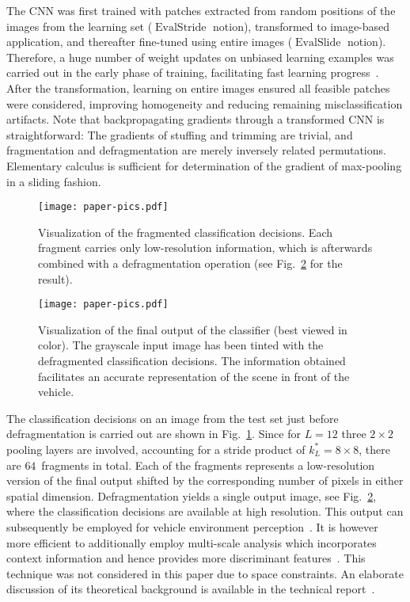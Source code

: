 \documentclass[journal]{IEEEtran}
\DeclareMathOperator{\EvalStride}{EvalStride}
\DeclareMathOperator{\EvalSlide}{EvalSlide}
\begin{document}
The CNN was first trained with patches extracted from random positions of the images from the learning set ($\EvalStride$ notion), transformed to image-based application, and thereafter fine-tuned using entire images ($\EvalSlide$ notion).
Therefore, a huge number of weight updates on unbiased learning examples was carried out in the early phase of training, facilitating fast learning progress~\cite{Bottou2004}.
After the transformation, learning on entire images ensured all feasible patches were considered, improving homogeneity and reducing remaining misclassification artifacts.
Note that backpropagating gradients through a transformed CNN is straightforward:
The gradients of stuffing and trimming are trivial, and fragmentation and defragmentation are merely inversely related permutations.
Elementary calculus is sufficient for determination of the gradient of max-pooling in a sliding fashion.

\begin{figure}[t]
  \centering
  \texttt{[image: paper-pics.pdf]}
  \caption{Visualization of the fragmented classification decisions. Each fragment carries only low-resolution information, which is afterwards combined with a defragmentation operation (see Fig.~\ref{fig:tinted} for the result).}
  \label{fig:fragmented-tinted}
\end{figure}
\begin{figure}[t]
  \centering
  \texttt{[image: paper-pics.pdf]}
  \caption{Visualization of the final output of the classifier (best viewed in color). The grayscale input image has been tinted with the defragmented classification decisions. The information obtained facilitates an accurate representation of the scene in front of the vehicle.}
  \label{fig:tinted}
\end{figure}

The classification decisions on an image from the test set just before defragmentation is carried out are shown in Fig.~\ref{fig:fragmented-tinted}.
Since for $L = 12$ three $2\times 2$ pooling layers are involved, accounting for a stride product of $k_L^* = 8\times 8$, there are $64$~fragments in total.
Each of the fragments represents a low-resolution version of the final output shifted by the corresponding number of pixels in either spatial dimension.
Defragmentation yields a single output image, see Fig.~\ref{fig:tinted}, where the classification decisions are available at high resolution.
This output can subsequently be employed for vehicle environment perception~\cite{Nuss2014}.
It is however more efficient to additionally employ multi-scale analysis which incorporates context information and hence provides more discriminant features~\cite{Farabet2013}.
This technique was not considered in this paper due to space constraints.
An elaborate discussion of its theoretical background is available in the technical report~\cite{Thom2016}.
\end{document}
